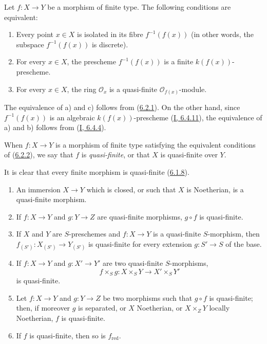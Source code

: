 \begin{corollary}[6.2.2]
\label{II.6.2.2}
Let $f:X\to Y$ be a morphism of finite type. The following conditions are
equivalent:
\begin{enumerate}
\item[a)] Every point $x\in X$ is isolated in its fibre $f^{-1}(f(x))$
(in other words, the subspace $f^{-1}(f(x))$ is discrete).
\item[b)] For every $x\in X$, the prescheme $f^{-1}(f(x))$ is a finite
$k(f(x))$-prescheme.
\item[c)] For every $x\in X$, the ring $\mathcal{O}_x$ is a quasi-finite
$\mathcal{O}_{f(x)}$-module.
\end{enumerate}
\end{corollary}

The equivalence of a) and c) follows from
(\hyperref[II.6.2.1]{6.2.1}). On the other hand, since $f^{-1}(f(x))$ is
an algebraic $k(f(x))$-prescheme (\hyperref[I.6.4.11]{I, 6.4.11}), the
equivalence of a) and b) follows from (\hyperref[I.6.4.4]{I, 6.4.4}).

\begin{definition}[6.2.3]
\label{II.6.2.3}
When $f:X\to Y$ is a morphism of finite type satisfying the equivalent
conditions of (\hyperref[II.6.2.2]{6.2.2}), we say that $f$ is
\emph{quasi-finite}, or that $X$ is quasi-finite over $Y$.
\end{definition}

It is clear that every finite morphism is quasi-finite
(\hyperref[II.6.1.8]{6.1.8}).

\begin{proposition}[6.2.4]
\label{II.6.2.4}
\begin{enumerate}
\item[(i)] An immersion $X\to Y$ which is closed, or such that $X$ is
Noetherian, is a quasi-finite morphism.
\item[(ii)] If $f:X\to Y$ and $g:Y\to Z$ are quasi-finite morphisms,
$g\circ f$ is quasi-finite.
\item[(iii)] If $X$ and $Y$ are $S$-preschemes and $f:X\to Y$ is a
quasi-finite $S$-morphism, then $f_{(S')}:X_{(S')}\to Y_{(S')}$ is
quasi-finite for every extension $g:S'\to S$ of the base.
\item[(iv)] If $f:X\to Y$ and $g:X'\to Y'$ are two quasi-finite
$S$-morphisms,
\[
f\times_S g:X\times_S Y\to X'\times_S Y'
\]
is quasi-finite.
\item[(v)] Let $f:X\to Y$ and $g:Y\to Z$ be two morphisms such that $g\circ
f$ is quasi-finite; then, if moreover $g$ is separated, or $X$ Noetherian, or
$X\times_ZY$ locally Noetherian, $f$ is quasi-finite.
\item[(vi)] If $f$ is quasi-finite, then so is $f_{\mathrm{red}}$.
\end{enumerate}
\end{proposition}

